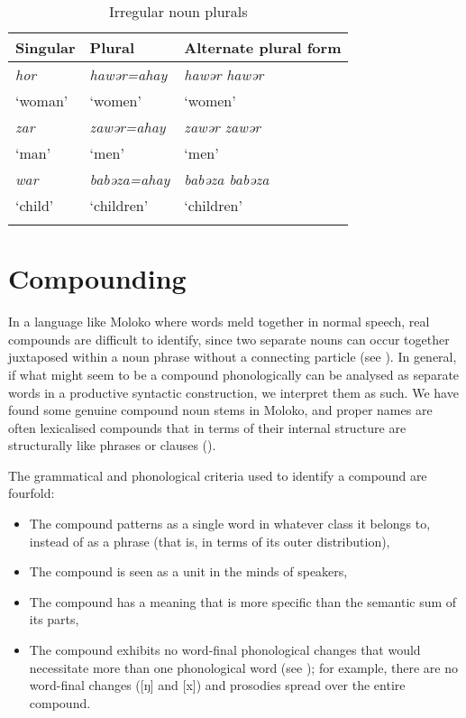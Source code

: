 \begin{table}
\begin{tabular}{lll}
\lsptoprule
{Singular} & {Plural} & {Alternate plural form}\\
\midrule
\textit{hor} & \textit{hawər=ahay} & \textit{hawər hawər} \\
 ‘woman’ & ‘women’  & ‘women’\\\midrule
\textit{zar}  & \textit{zawər=ahay} & \textit{zawər zawər} \\
‘man’ &  ‘men’  & ‘men’\\\midrule
\textit{war} & \textit{babəza=ahay} & \textit{babəza babəza} \\
 ‘child’ & ‘children’  & ‘children’\\
\lspbottomrule
\end{tabular}
\caption{Irregular noun plurals}\label{tab:31}
\end{table}
\section{Compounding}\label{sec:4.3}
\hypertarget{RefHeading1211521525720847}{}
In a language like Moloko where   words meld together in normal speech, real compounds are difficult to identify, since two separate nouns can occur together juxtaposed within a noun phrase without a connecting particle (see ). In general, if what might seem to be a compound phonologically can be analysed as separate words in a productive syntactic construction, we interpret them as such. We have found some genuine compound noun stems in Moloko, and proper names are often lexicalised compounds that in terms of their internal structure are structurally like phrases or clauses (). 

The grammatical and phonological criteria used to identify a compound are fourfold:
\largerpage
\begin{itemize}
\item The compound patterns as a single word in whatever class it belongs to, instead of as a phrase (that is, in terms of its outer distribution),
\item    The compound is seen as a unit in the minds of speakers,
\item The compound has a meaning that is more specific than the semantic sum of its parts,
\item The compound exhibits no word-final phonological changes that would necessitate more than one phonological word (see ); for example, there are no word-final changes ([ŋ] and [x]) and prosodies spread over the entire compound.
\end{itemize}

